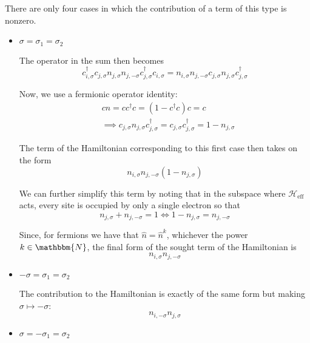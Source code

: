 There are only four cases in which the contribution of a term of this type is nonzero.
\begin{itemize}
\item $\sigma = \sigma_1 = \sigma_2$

The operator in the sum then becomes
\begin{equation*}
c_{i,\sigma}^\dagger c_{j,\sigma} n_{j,\sigma} n_{j, -\sigma} c_{j, \sigma}^\dagger c_{i, \sigma} = n_{i,\sigma} n_{j, -\sigma} c_{j,\sigma} n_{j, \sigma} c_{j, \sigma}^\dagger
\end{equation*}

Now, we use a fermionic operator identity:
\begin{equation*}
\begin{split}
&c n = c c^\dagger c = ( 1 -  c^\dagger c ) c = c \\
&\implies c_{j,\sigma} n_{j,\sigma} c_{j,\sigma}^\dagger = c_{j,\sigma} c_{j,\sigma}^\dagger = 1 - n_{j,\sigma}
\end{split}
\end{equation*}

The term of the Hamiltonian corresponding to this first case then takes on the form
\begin{equation*}
n_{i,\sigma} n_{j,-\sigma} ( 1 - n_{j, \sigma} )
\end{equation*}

We can further simplify this term by noting that in the subspace where $\mathcal{H}_{\text{eff}}$ acts, every site is occupied by only a single electron so that
\begin{equation*}
n_{j,\sigma} + n_{j,-\sigma} = 1 \iff 1 - n_{j,\sigma} = n_{j,-\sigma}
\end{equation*}

Since, for fermions we have that $\hat{n} = \hat{n}^k$, whichever the power $k \in \mathbbm{N}$, the final form of the sought term of the Hamiltonian is
\begin{equation*}
n_{i,\sigma} n_{j, -\sigma}
\end{equation*}

\item $-\sigma = \sigma_1 = \sigma_2$

The contribution to the Hamiltonian is exactly of the same form but making $\sigma \mapsto -\sigma$:
\begin{equation*}
n_{i,-\sigma} n_{j, \sigma}
\end{equation*}

\item $\sigma = - \sigma_1 = \sigma_2$


\end{itemize}
